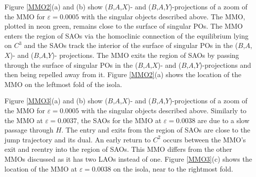 \documentclass{ws-ijbc}
\begin{document}
Figure \ref{MMO2}(a) and (b) show ($B$,$A$,$X$)- and ($B$,$A$,$Y$)-projections of a zoom of the MMO for $\varepsilon=0.0005$ with the singular objects described above.  The MMO, plotted in neon green, remains close to the surface of singular POs.  The MMO enters the region of SAOs via the homoclinic connection of the equilibrium lying on $C^3$ and the SAOs track the interior of the surface of singular POs in the ($B$,$A$,$X$)- and ($B$,$A$,$Y$)- projections.  The MMO exits the region of SAOs by passing through the surface of singular POs in the ($B$,$A$,$X$)- and ($B$,$A$,$Y$)-projections and then being repelled away from it.  Figure \ref{MMO2}(a) shows the location of the MMO on the leftmost fold of the isola.

Figure \ref{MMO3}(a) and (b) show ($B$,$A$,$X$)- and ($B$,$A$,$Y$)-projections of a zoom of the MMO for $\varepsilon=0.0005$ with the singular objects described above.  Similarly to the MMO at $\varepsilon=0.0037$, the SAOs for the MMO at $\varepsilon = 0.0038$ are due to a slow passage through $H$.  The entry and exits from the region of SAOs are close to the jump trajectory and its dual.  An early return to $C^2$ occurs between the MMO's exit and reentry into the region of SAOs.  This MMO differs from the other MMOs discussed as it has two LAOs instead of one.  Figure \ref{MMO3}(c) shows the location of the MMO at $\varepsilon=0.0038$ on the isola, near to the rightmost fold.
\end{document}
